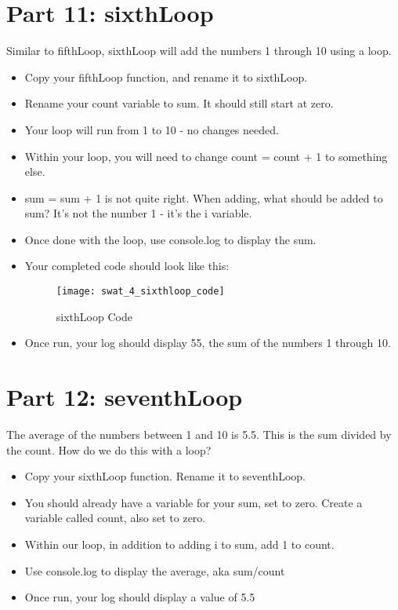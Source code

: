\documentclass{article}
\begin{document}
\section*{Part 11: sixthLoop}
Similar to fifthLoop, sixthLoop will add the numbers 1 through 10 using a loop.
\begin{itemize}
	\item Copy your fifthLoop function, and rename it to sixthLoop.
	\item Rename your count variable to sum.  It should still start at zero.
	\item Your loop will run from 1 to 10 - no changes needed.
	\item Within your loop, you will need to change count = count + 1 to something else.
	\item sum = sum + 1 is not quite right.  When adding, what should be added to sum?  It's not the number 1 - it's the i variable.
	\item Once done with the loop, use console.log to display the sum.
	\item Your completed code should look like this:
	\begin{figure}[H]
  		\centering
  		\texttt{[image: swat\_4\_sixthloop\_code]}
  		\caption{sixthLoop Code}
	\end{figure}
	\item Once run, your log should display 55, the sum of the numbers 1 through 10.
\end{itemize}

\section*{Part 12: seventhLoop}
The average of the numbers between 1 and 10 is 5.5.  This is the sum divided by the count.  How do we do this with a loop?
\begin{itemize}
	\item Copy your sixthLoop function.  Rename it to seventhLoop.
	\item You should already have a variable for your sum, set to zero.  Create a variable called count, also set to zero.
	\item Within our loop, in addition to adding i to sum, add 1 to count.
	\item Use console.log to display the average, aka sum/count
	\item Once run, your log should display a value of 5.5
\end{itemize}
\end{document}
